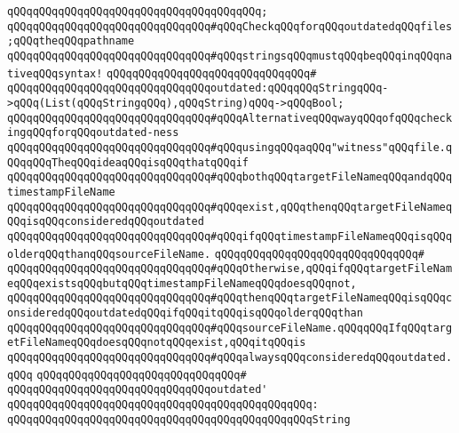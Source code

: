\verb|qQQqqQQqqQQqqQQqqQQqqQQqqQQqqQQqqQQqqQQq;|\newline
\newline
\verb|qQQqqQQqqQQqqQQqqQQqqQQqqQQqqQQq#qQQqCheckqQQqforqQQqoutdatedqQQqfiles;qQQqtheqQQqpathname|\newline
\verb|qQQqqQQqqQQqqQQqqQQqqQQqqQQqqQQq#qQQqstringsqQQqmustqQQqbeqQQqinqQQqnativeqQQqsyntax!|\newline
\verb|qQQqqQQqqQQqqQQqqQQqqQQqqQQqqQQq#|\newline
\verb|qQQqqQQqqQQqqQQqqQQqqQQqqQQqqQQqoutdated:qQQqqQQqStringqQQq->qQQq(List(qQQqStringqQQq),qQQqString)qQQq->qQQqBool;|\newline
\newline
\verb|qQQqqQQqqQQqqQQqqQQqqQQqqQQqqQQq#qQQqAlternativeqQQqwayqQQqofqQQqcheckingqQQqforqQQqoutdated-ness|\newline
\verb|qQQqqQQqqQQqqQQqqQQqqQQqqQQqqQQq#qQQqusingqQQqaqQQq"witness"qQQqfile.qQQqqQQqTheqQQqideaqQQqisqQQqthatqQQqif|\newline
\verb|qQQqqQQqqQQqqQQqqQQqqQQqqQQqqQQq#qQQqbothqQQqtargetFileNameqQQqandqQQqtimestampFileName|\newline
\verb|qQQqqQQqqQQqqQQqqQQqqQQqqQQqqQQq#qQQqexist,qQQqthenqQQqtargetFileNameqQQqisqQQqconsideredqQQqoutdated|\newline
\verb|qQQqqQQqqQQqqQQqqQQqqQQqqQQqqQQq#qQQqifqQQqtimestampFileNameqQQqisqQQqolderqQQqthanqQQqsourceFileName.|\newline
\verb|qQQqqQQqqQQqqQQqqQQqqQQqqQQqqQQq#|\newline
\verb|qQQqqQQqqQQqqQQqqQQqqQQqqQQqqQQq#qQQqOtherwise,qQQqifqQQqtargetFileNameqQQqexistsqQQqbutqQQqtimestampFileNameqQQqdoesqQQqnot,|\newline
\verb|qQQqqQQqqQQqqQQqqQQqqQQqqQQqqQQq#qQQqthenqQQqtargetFileNameqQQqisqQQqconsideredqQQqoutdatedqQQqifqQQqitqQQqisqQQqolderqQQqthan|\newline
\verb|qQQqqQQqqQQqqQQqqQQqqQQqqQQqqQQq#qQQqsourceFileName.qQQqqQQqIfqQQqtargetFileNameqQQqdoesqQQqnotqQQqexist,qQQqitqQQqis|\newline
\verb|qQQqqQQqqQQqqQQqqQQqqQQqqQQqqQQq#qQQqalwaysqQQqconsideredqQQqoutdated.qQQq|\newline
\verb|qQQqqQQqqQQqqQQqqQQqqQQqqQQqqQQq#|\newline
\verb|qQQqqQQqqQQqqQQqqQQqqQQqqQQqqQQqoutdated'|\newline
\verb|qQQqqQQqqQQqqQQqqQQqqQQqqQQqqQQqqQQqqQQqqQQqqQQq:|\newline
\verb|qQQqqQQqqQQqqQQqqQQqqQQqqQQqqQQqqQQqqQQqqQQqqQQqString|\newline
